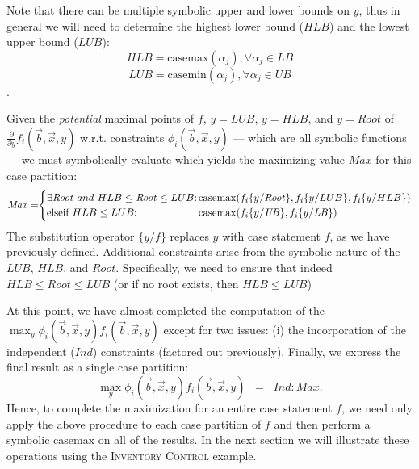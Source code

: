 \documentclass[twoside,11pt]{article}
\newcommand{\casemax}{\mathrm{casemax}}
\newcommand{\casemin}{\mathrm{casemin}}
\newcommand{\UB}{\mathit{UB}}
\newcommand{\LB}{\mathit{LB}}
\newcommand{\IND}{\mathit{Ind}}
\newcommand{\CONS}{\mathit{Cons}}
\newcommand{\Root}{\mathit{Root}}
\newcommand{\Max}{\mathit{Max}}
\newcommand{\sq}{\hspace{-1mm}}
\newcommand{\sqm}{\hspace{-2mm}}
\newcommand{\InventoryControl}{\textsc{Inventory Control }}
\begin{document}
Note that there can be multiple symbolic upper and lower
bounds on $y$, thus in general we will need to determine the highest lower bound ($HLB$) and the lowest upper bound ($LUB$): 
$$HLB = \casemax(\alpha_j), \forall \alpha_j \in \LB$$  $$LUB = \casemin(\alpha_j), \forall \alpha_j \in \UB$$.

Given the \emph{potential} maximal points of $f$, $y = LUB$, $y = HLB$, and
$y = \Root$ of $\frac{\partial}{\partial y} f_i(\vec{b},\vec{x},y)$
w.r.t. constraints $\phi_i(\vec{b},\vec{x},y)$ --- which are all
symbolic functions --- we must symbolically evaluate which yields the
maximizing value $\Max$ for this case partition:
\vspace{2mm}
{%
\begin{align}
\Max =  \sq \begin{cases}
\mbox{$\exists \Root\ and\ HLB \leq \Root \leq LUB$}  \sq: \sq & \sqm \casemax( f_i \{ y / \Root \}, f_i \{ y / LUB \}, f_i \{ y / HLB \})\\
\mbox{elseif}\ HLB \leq LUB \sq:  \sq & \sqm \casemax( f_i \{ y / \UB \}, f_i \{ y / \LB \})
\end{cases}
\label{eq:maxhlblub}
\end{align}}
The 
substitution operator $\{ y / f \}$ replaces $y$ with case statement $f$, as we have previously defined. Additional constraints arise from the
symbolic nature of the $LUB$, $HLB$, and $\Root$. Specifically, we need to ensure that indeed $HLB \leq \Root \leq LUB$
(or if no root exists, then $HLB \leq LUB$)

At this point, we have almost completed the computation
of the $\max_y \phi_i(\vec{b},\vec{x},y) f_i(\vec{b},\vec{x},y)$
except for two issues: (i) the incorporation of the independent ($\IND$) constraints
(factored out previously). 
Finally, we express the final result as a single case partition:
\begin{equation}
\max_y \phi_i(\vec{b},\vec{x},y) f_i(\vec{b},\vec{x},y) \;\; = \;\;
  \IND: \Max .
\label{eq:maxcasepartition}
\end{equation}
Hence, to complete the maximization for an entire case statement $f$, we need only apply the above procedure to each case partition of $f$ and then perform a symbolic $\casemax$ on all of the results. In the next section we will illustrate these operations using the \InventoryControl example.  
\end{document}
